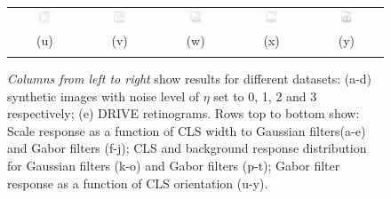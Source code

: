 \documentclass{IEEEtran}
\begin{document}
\begin{figure}[t]
\begin{tabular}{@{}c c c c c@{}}
\includegraphics[width=0.18\textwidth]{figs/synthetic/syn_lines_gabor_ori_subbands_0} &
\includegraphics[width=0.18\textwidth]{figs/synthetic/syn_lines_gabor_ori_subbands_1} &
\includegraphics[width=0.18\textwidth]{figs/synthetic/syn_lines_gabor_ori_subbands_2} &
\includegraphics[width=0.18\textwidth]{figs/synthetic/syn_lines_gabor_ori_subbands_3} &
\includegraphics[width=0.18\textwidth]{figs/retina/ret_vessels_gabor_ori_subbands} \\
(u) & (v) & (w) & (x) & (y)\\
\noalign{\smallskip}

\end{tabular}
%
\caption{\emph{Columns from left to right} show results for different datasets: (a-d) synthetic images with noise level of $\eta$ set to 0, 1, 2 and 3 respectively; (e) DRIVE retinograms. Rows top to bottom show: Scale response as a function of CLS width to Gaussian filters(a-e) and Gabor filters (f-j); CLS and background response distribution for Gaussian filters (k-o) and Gabor filters (p-t); Gabor filter response as a function of CLS orientation (u-y).}
\label{f:synthetic_exp1}
\end{figure}
\end{document}
